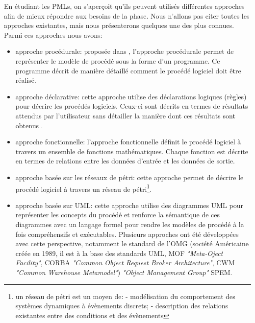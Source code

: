 En étudiant les PMLs, on s'aperçoit qu'ils peuvent utilisés différentes approches afin de mieux répondre aux besoins de la phase. Nous n'allons pas citer toutes les approches existantes, mais nous présenterons quelques une des plus connues. Parmi ces approches nous avons:
\begin{itemize}
\item approche procédurale: proposée dans \cite{lo}, l'approche procédurale permet de représenter le modèle de procédé sous la forme d'un programme. Ce programme décrit de manière détaillé comment le procédé logiciel doit être réalisé.
\item approche déclarative: cette approche utilise des déclarations logiques (règles) pour décrire les procédés logiciels. Ceux-ci sont décrits en termes de résultats attendus par l'utilisateur sans détailler la manière dont ces résultats sont obtenus \cite{lgw}.
\item approche fonctionnelle: l'approche fonctionnelle définit le procédé logiciel à travers un ensemble de fonctions mathématiques. Chaque fonction est décrite en termes de relations entre les données d'entrée et les données de sortie. 
\item approche basée sur les réseaux de pétri: cette approche permet de décrire le procédé logiciel à travers un réseau de pétri\footnote{un réseau de pétri est un moyen de: - modélisation du comportement des systèmes dynamiques à évènements discrets; - description des relations existantes entre des conditions et des évènements}.
\item approche basée sur UML: cette approche utilise des diagrammes UML pour représenter les concepts du procédé et renforce la sémantique de ces diagrammes avec un langage formel pour rendre les modèles de procédé à la fois compréhensifs et exécutables. 
Plusieurs approches ont été développées avec cette perspective, notamment le standard de l'OMG (société Américaine créée en 1989, il est à la base des standards UML, MOF \textit{"Meta-Oject Facility"}, CORBA \textit{"Common Object Request Broker Architecture"}, CWM \textit{"Common Warehouse Metamodel"}) \textit{"Object Management Group"} SPEM.

\end{itemize}
